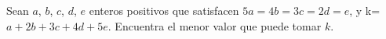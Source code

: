 Sean $a$, $b$, $c$, $d$, $e$ enteros positivos que satisfacen $5a=4b=3c=2d=e$, y k=$a+2b+3c+4d+5e$. Encuentra el menor valor que puede tomar $k$.